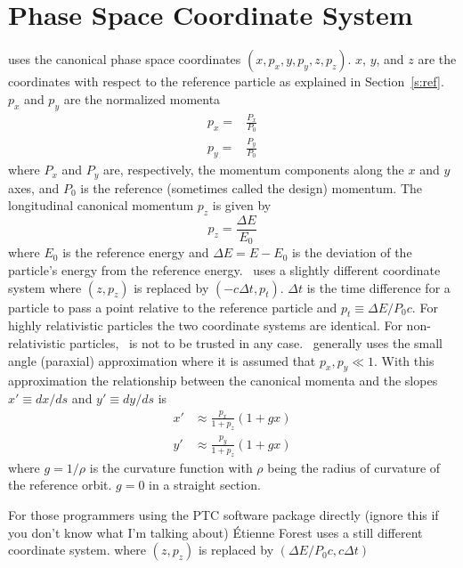 \section{Phase Space Coordinate System}
\label{s:phase_space_coords}

\bmad uses the canonical phase space coordinates 
$(x, p_x, y, p_y, z, p_z)$. $x$, $y$, and $z$ are the
coordinates with respect to the reference particle as explained in
Section~\ref{s:ref}. $p_x$ and $p_y$ are the normalized momenta
\begin{align}
  p_x = &\frac{P_x}{P_0} \\
  p_y = &\frac{P_y}{P_0}
\end{align}
where $P_x$ and $P_y$ are, respectively, the momentum components along the $x$ and
$y$ axes, and $P_0$ is the reference (sometimes called the
design) momentum. The longitudinal canonical momentum $p_z$ is given by
\begin{equation}
  p_z = \frac{\Delta E}{E_0}
\end{equation}
where $E_0$ is the reference energy and $\Delta E = E - E_0$ is the
deviation of the particle's energy from the reference energy. \mad\ uses
a slightly different coordinate system where $(z, p_z)$ is
replaced by $(-c\Delta t, p_t)$. $\Delta t$ is the time
difference for a particle to pass a point relative to the reference
particle and $p_t \equiv \Delta E / P_0 c$. For highly relativistic
particles the two coordinate systems are identical. For
non-relativistic particles, \bmad\ is not to be trusted in any
case. \bmad\ generally uses the small angle (paraxial) approximation
where it is assumed that $p_x, p_y \ll 1$. With this approximation the
relationship between the canonical momenta and the slopes $x' \equiv dx/ds$
and $y' \equiv dy/ds$ is
\begin{align}
  x' &\approx \frac{p_x}{1 + p_z} (1 + g x) \\
  y' &\approx \frac{p_y}{1 + p_z} (1 + g x) 
\end{align}
where $g = 1/\rho$ is the curvature function with $\rho$ being the radius
of curvature of the reference orbit. $g = 0$ in a straight section.

For those programmers using the PTC software package directly (ignore
this if you don't know what I'm talking about) \'Etienne Forest uses a still
different coordinate system. where  $(z, p_z)$ is replaced by
$(\Delta E/P_0 c, c \Delta t)$